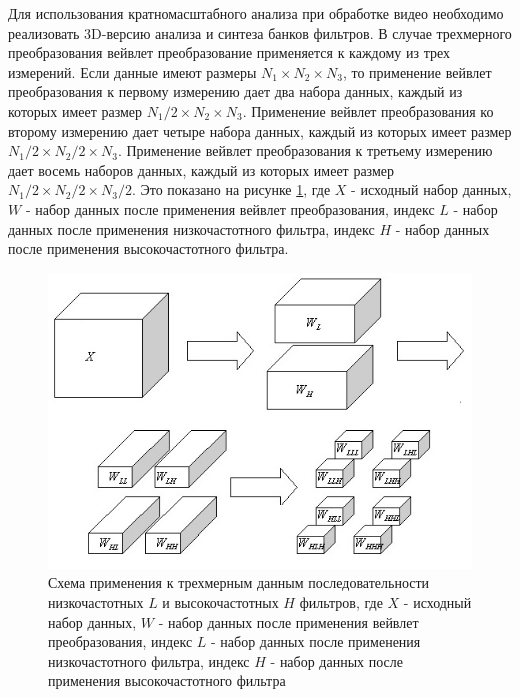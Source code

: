 Для использования кратномасштабного анализа при обработке видео необходимо реализовать 3D-версию 
анализа и синтеза банков фильтров. В случае трехмерного преобразования вейвлет преобразование применяется к 
каждому из трех измерений. Если данные имеют размеры $N_{1} \times N_{2} \times N_{3}$, то применение вейвлет преобразования к первому измерению
дает два набора данных, каждый из которых имеет размер $N_{1} / 2 \times N_{2} \times N_{3}$. 
Применение вейвлет преобразования ко второму измерению дает четыре набора данных, 
каждый из которых имеет размер $N_{1} / 2 \times N_{2} / 2 \times N_{3}$. Применение вейвлет преобразования 
к третьему измерению дает восемь наборов данных, каждый из которых имеет размер $N_{1} / 2 \times N_{2} / 2 \times N_{3} / 2$. 
Это показано на рисунке \ref{fig:fig01}, где $X$ - исходный набор данных, $W$ - набор данных после применения вейвлет преобразования,
индекс $L$ - набор данных после применения низкочастотного фильтра, индекс $H$ - набор данных после применения высокочастотного фильтра.

\begin{figure}[ht]
  \centering
  \includegraphics[scale=0.75]{inc/graphics/3dwave.png}
  \caption{Схема применения к трехмерным данным последовательности низкочастотных $L$ и высокочастотных $H$ фильтров, где $X$ - исходный набор данных, $W$ - набор данных после применения вейвлет преобразования,
индекс $L$ - набор данных после применения низкочастотного фильтра, индекс $H$ - набор данных после применения высокочастотного фильтра}
  \label{fig:fig01}
\end{figure}

